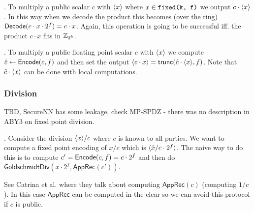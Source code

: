 .
To multiply a public scalar
$c$ with $\langle {x} \rangle$ where $x \in \verb|fixed(k, f)|$ we output
$c \cdot \langle {x} \rangle$. In this way when we decode the product
this becomes (over the ring)
$\mathsf{Decode}(c \cdot x \cdot 2^f) = c \cdot x$. Again, this operation is going to
be successful iff. the product $c \cdot x$ fits in $\mathbb{Z}_{2^k}$.

. To multiply a
public floating point scalar $c$ with $\langle {x} \rangle$ we compute $\hat{c} \gets
\mathsf{Encode}(c, f)$ and then set the output $\langle {c \cdot x} \rangle =
\mathsf{trunc}(\hat{c} \cdot \langle {x} \rangle, f)$. Note that $\hat{c} \cdot \langle {x} \rangle$
can be done with local computations.

\subsubsection{Division}
TBD, SecureNN has some leakage, check MP-SPDZ - there was no description in
ABY3 on fixed point division.

.
Consider the division $\langle {x} \rangle / c$ where $c$ is known to all parties. We want to compute a
fixed point encoding of $x/c$ which is $\langle {\hat{x} / c \cdot 2^f} \rangle$. The naive way to do
this is to compute $c' = \mathsf{Encode}(c, f) = c \cdot 2^f$ and then do
$\mathsf{GoldschmidtDiv}(x \cdot 2^f, \mathsf{AppRec}(c'))$.

See Catrina et al. where they talk about computing $\mathsf{AppRec}(c)$ (computing $1/c$). In this
case $\mathsf{AppRec}$ can be computed in the clear so we can avoid this protocol if $c$ is public.

